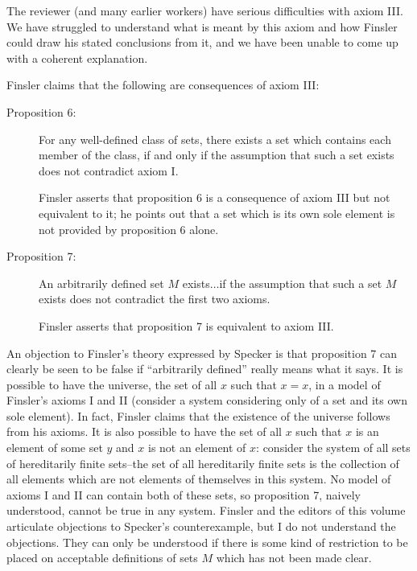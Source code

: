 The reviewer (and many earlier workers) have serious difficulties with
axiom III.  We have struggled to understand what is meant by this
axiom and how Finsler could draw his stated conclusions from it, and
we have been unable to come up with a coherent explanation.

Finsler claims that the following are consequences of axiom III:

\begin{description}

\item[Proposition 6:] For any well-defined class of sets, there exists
a set which contains each member of the class, if and only if the
assumption that such a set exists does not contradict axiom I.

Finsler asserts that proposition 6 is a consequence of axiom III but
not equivalent to it; he points out that a set which is its own sole
element is not provided by proposition 6 alone.

\item[Proposition 7:] An arbitrarily defined set $M$ exists$\ldots$if
the assumption that such a set $M$ exists does not contradict the
first two axioms.

Finsler asserts that proposition 7 is equivalent to axiom III.

\end{description}

An objection to Finsler's theory expressed by Specker is that
proposition 7 can clearly be seen to be false if ``arbitrarily
defined'' really means what it says.  It is possible to have the
universe, the set of all $x$ such that $x=x$, in a model of Finsler's
axioms I and II (consider a system considering only of a set and its
own sole element).  In fact, Finsler claims that the existence of the
universe follows from his axioms.  It is also possible to have the set
of all $x$ such that $x$ is an element of some set $y$ and $x$ is not
an element of $x$: consider the system of all sets of hereditarily
finite sets--the set of all hereditarily finite sets is the collection
of all elements which are not elements of themselves in this system.
No model of axioms I and II can contain both of these sets, so
proposition 7, naively understood, cannot be true in any system.
Finsler and the editors of this volume articulate objections to
Specker's counterexample, but I do not understand the objections.
They can only be understood if there is some kind of restriction to be
placed on acceptable definitions of sets $M$ which has not been made
clear.

